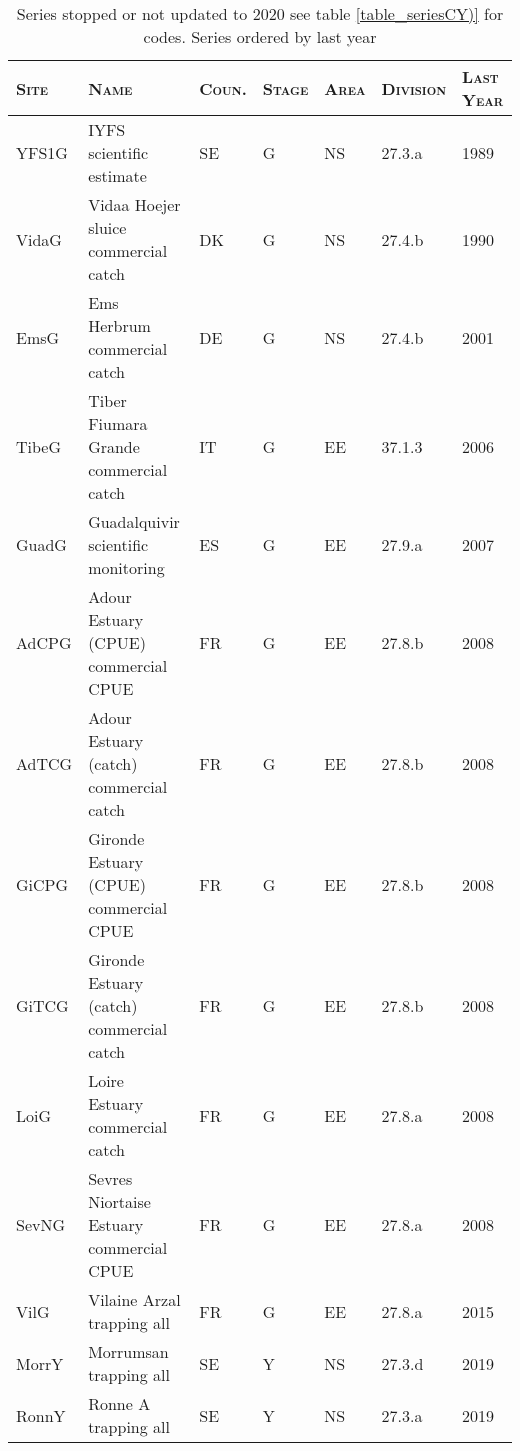 \begin{table}[htbp]
\centering
\caption{Series stopped or not updated to 2020 see table \ref{table_seriesCY)} for codes. Series ordered by last year} 
\label{table_serieslost}
\begin{tabularx}{\textwidth}{p{1.3cm}p{6.5cm}p{1cm}p{1cm}p{1cm}p{1.4cm}p{1.2cm}}
  \hline
\scshape{Site} & \scshape{Name} & \scshape{Coun.} & \scshape{Stage} & \scshape{Area} & \scshape{Division} & \scshape{Last Year} \\ 
  \hline
YFS1G & IYFS scientific estimate & SE & G & NS & 27.3.a & 1989 \\ 
  VidaG & Vidaa Hoejer sluice commercial catch & DK & G & NS & 27.4.b & 1990 \\ 
  EmsG & Ems Herbrum commercial catch & DE & G & NS & 27.4.b & 2001 \\ 
  TibeG & Tiber Fiumara Grande commercial catch & IT & G & EE & 37.1.3 & 2006 \\ 
  GuadG & Guadalquivir scientific monitoring & ES & G & EE & 27.9.a & 2007 \\ 
  AdCPG & Adour Estuary (CPUE) commercial CPUE & FR & G & EE & 27.8.b & 2008 \\ 
  AdTCG & Adour Estuary (catch) commercial catch & FR & G & EE & 27.8.b & 2008 \\ 
  GiCPG & Gironde Estuary (CPUE) commercial CPUE & FR & G & EE & 27.8.b & 2008 \\ 
  GiTCG & Gironde Estuary (catch) commercial catch & FR & G & EE & 27.8.b & 2008 \\ 
  LoiG & Loire Estuary commercial catch & FR & G & EE & 27.8.a & 2008 \\ 
  SevNG & Sevres Niortaise Estuary commercial CPUE & FR & G & EE & 27.8.a & 2008 \\ 
  VilG & Vilaine Arzal trapping all & FR & G & EE & 27.8.a & 2015 \\ 
  MorrY & Morrumsan  trapping all & SE & Y & NS & 27.3.d & 2019 \\ 
  RonnY & Ronne A  trapping all & SE & Y & NS & 27.3.a & 2019 \\ 
   \hline
\end{tabularx}
\end{table}
